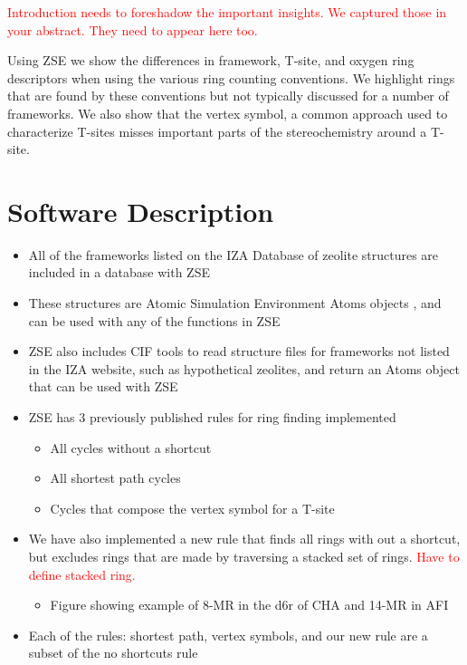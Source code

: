 \documentclass[11pt]{article}
\newcommand{\red}[1]{\textcolor{red}{#1}}
\begin{document}
\red{Introduction needs to foreshadow the important insights. We captured those in your abstract. They need to appear here too.}

Using ZSE we show the differences in framework, T-site, and oxygen ring descriptors when using the various ring counting conventions. We highlight rings that are found by these conventions but not typically discussed for a number of frameworks. We also show that the vertex symbol, a common approach used to characterize T-sites misses important parts of the stereochemistry around a T-site. 


\section*{Software Description}
\label{sec:org4b5bf0e}

\begin{itemize}
\item All of the frameworks listed on the IZA Database of zeolite structures \cite{baerlocher-database-nodate} are included in a database with ZSE
\item These structures are Atomic Simulation Environment Atoms objects \cite{larsen-atomic-2017}, and can be used with any of the functions in ZSE
\item ZSE also includes CIF tools to read structure files for frameworks not listed in the IZA website, such as hypothetical zeolites, and return an Atoms object that can be used with ZSE
\item ZSE has 3 previously published rules for ring finding implemented
\begin{itemize}
\item All cycles without a shortcut \cite{goetzke-properties-1991}
\item All shortest path cycles \cite{sastre-topological-2009}
\item Cycles that compose the vertex symbol for a T-site \cite{okeeffe-vertex-1997}
\end{itemize}
\item We have also implemented a new rule that finds all rings with out a shortcut, but excludes rings that are made by traversing a stacked set of rings. \red{Have to define stacked ring.}
\begin{itemize}
\item Figure showing example of 8-MR in the d6r of CHA and 14-MR in AFI
\end{itemize}
\item Each of the rules: shortest path, vertex symbols, and our new rule are a subset of the no shortcuts rule
\end{itemize}
\end{document}
